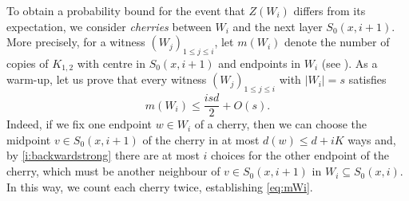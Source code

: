 \documentclass[reqno,a4paper,11pt]{amsart}
\theoremstyle{definition}
\renewcommand{\leq}{\leqslant}
\begin{document}
To obtain a probability bound for the event that $Z(W_i)$ differs from its expectation, we consider \emph{cherries} between $W_i$ and the next layer $S_0(x, i+1)$.
More precisely, for a witness $(W_j)_{1 \leq j \leq i}$, let $m(W_i)$ denote the number of copies of $K_{1, 2}$ with centre in $S_0(x, i+1)$ and endpoints in $W_i$ (see ).
As a warm-up, let us prove that every witness $(W_j)_{1 \leq j \leq i}$ with $|W_i|=s$ satisfies
\begin{equation}\label{eq:mWi}
  m(W_i)\leq \frac{isd}{2} + O(s).
\end{equation}
Indeed, if we fix one endpoint $w \in W_i$ of a cherry, then we can choose the midpoint $v \in S_0(x, i+1)$ of the cherry in at most $d(w) \leq d+iK$ ways and, by \ref{i:backwardstrong} there are at most $i$ choices for the other endpoint of the cherry, which must be another neighbour of $v \in S_0(x,i+1)$ in $W_i \subseteq S_0(x,i)$.
In this way, we count each cherry twice, establishing \eqref{eq:mWi}.
\end{document}
